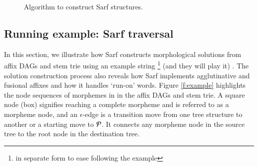 \begin{figure}[tb]
\caption{Algorithm to construct Sarf structures.}
\label{f:dag-alg}
\end{figure}

%

\transtrue


\subsection{Running example: Sarf traversal}

In this section, we illustrate how Sarf constructs morphological solutions from affix DAGs and stem trie using an example string 
\footnote{ 
%
in separate form to ease following the example
}
 (and they will play it) . The solution construction process also reveals how Sarf implements agglutinative and fusional affixes and how it handles `run-on' words.
Figure \ref{f:example} highlights the node sequences of morphemes in  in the affix DAGs and stem trie. A square node (box) signifies reaching a complete morpheme and is referred to as a morpheme node, and an $\epsilon$-edge is a transition move from one tree structure to another or a starting move to ${\cal P}$. It connects any morpheme node in the source tree to the root node in the destination tree.\\

